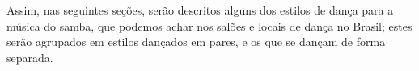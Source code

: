 Assim, nas seguintes seções, serão descritos alguns dos estilos de dança para a música do samba,  
que podemos achar nos salões e locais de dança no Brasil;
estes serão agrupados em estilos dançados em pares, e os que se dançam de forma separada. 

